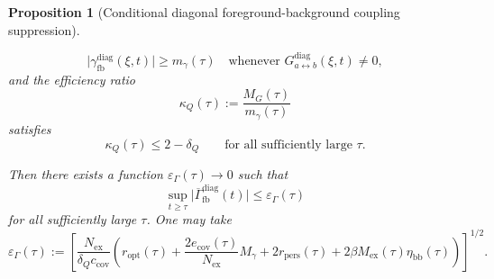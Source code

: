 \documentclass[12pt]{article}
\newtheorem{proposition}[theorem]{Proposition}
\theoremstyle{definition}
\theoremstyle{remark}
\begin{document}
\begin{proposition}[Conditional diagonal foreground-background coupling suppression]
\begin{enumerate}
\[  \]
  \[
  \bigl|
  \gamma_{\mathrm{fb}}^{\mathrm{diag}}(\xi,t)
  \bigr|
  \ge
  m_\gamma(\tau)
  \quad
  \text{whenever }
  G_{a\leftrightarrow b}^{\mathrm{diag}}(\xi,t)\neq 0,
  \]
  and the efficiency ratio
  \[
  \kappa_Q(\tau):=\frac{M_G(\tau)}{m_\gamma(\tau)}
  \]
  satisfies
  \[
  \kappa_Q(\tau)\le 2-\delta_Q
  \qquad
  \text{for all sufficiently large } \tau.
  \]
\end{enumerate}
Then there exists a function \(\varepsilon_\Gamma(\tau)\to 0\) such
that
\[
\sup_{t\ge\tau}
\bigl|
\overline{\Gamma}_{\mathrm{fb}}^{\mathrm{diag}}(t)
\bigr|
\le
\varepsilon_\Gamma(\tau)
\]
for all sufficiently large \(\tau\). One may take
\[
\varepsilon_\Gamma(\tau)
:=
\left[
\frac{N_{\mathrm{ex}}}{\delta_Q c_{\mathrm{cov}}}
\left(
r_{\mathrm{opt}}(\tau)
+
\frac{2e_{\mathrm{cov}}(\tau)}{N_{\mathrm{ex}}}M_\gamma
+
2r_{\mathrm{pers}}(\tau)
+
2\beta M_{\mathrm{ex}}(\tau)\eta_{\mathrm{bb}}(\tau)
\right)
\right]^{1/2}.
\]
\end{proposition}
\end{document}
